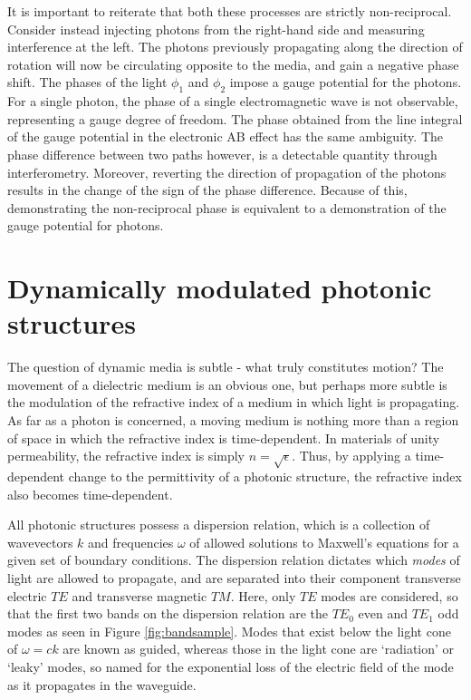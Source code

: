 It is important to reiterate that both these processes are strictly non-reciprocal. Consider instead injecting photons from the right-hand side and measuring interference at the left. The photons previously propagating along the direction of rotation will now be circulating opposite to the media, and gain a negative phase shift. The phases of the light $\phi_1$ and $\phi_2$ impose a gauge potential for the photons. For a single photon, the phase of a single electromagnetic wave is not observable, representing a gauge degree of freedom. The phase obtained from the line integral of the gauge potential in the electronic AB effect has the same ambiguity. The phase difference between two paths however, is a detectable quantity through interferometry. Moreover, reverting the direction of propagation of the photons results in the change of the sign of the phase difference. Because of this, demonstrating the non-reciprocal phase is equivalent to a demonstration of the gauge potential for photons. 

\section{Dynamically modulated photonic structures}

\label{sec:modulation}
The question of dynamic media is subtle - what truly constitutes motion? The movement of a dielectric medium is an obvious one, but perhaps more subtle is the modulation of the refractive index of a medium in which light is propagating. As far as a photon is concerned, a moving medium is nothing more than a region of space in which the refractive index is time-dependent. In materials of unity permeability, the refractive index is simply $n=\sqrt{\epsilon}$. Thus, by applying a time-dependent change to the permittivity of a photonic structure, the refractive index also becomes time-dependent.

All photonic structures possess a dispersion relation, which is a collection of wavevectors $k$ and frequencies $\omega$ of allowed solutions to Maxwell's equations for a given set of boundary conditions. The dispersion relation dictates which \textit{modes} of light are allowed to propagate, and are separated into their component transverse electric $TE$ and transverse magnetic $TM$. Here, only $TE$ modes are considered, so that the first two bands on the dispersion relation are the $TE_0$ even and $TE_1$ odd modes as seen in Figure \ref{fig:bandsample}. Modes that exist below the light cone of $\omega = c k$ are known as guided, whereas those in the light cone are `radiation' or `leaky' modes, so named for the exponential loss of the electric field of the mode as it propagates in the waveguide.


